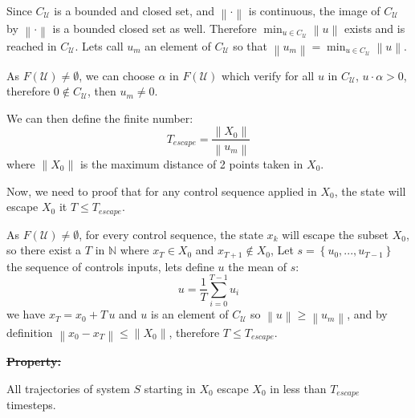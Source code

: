 \documentclass[12pt]{article}
\providecommand{\DIFdel}[1]{{\protect\color{red}\sout{#1}}}                      %
\providecommand{\DIFaddbegin}{} %
\providecommand{\DIFaddend}{} %
\providecommand{\DIFdelbegin}{} %
\providecommand{\DIFdelend}{} %
\begin{document}
Since $C_\mathcal{U}$ is a bounded and closed set, and $\left \| \cdot \right \|$ is continuous, the image of $C_\mathcal{U}$ by $\left \| \cdot \right \|$ is a bounded closed set as well.
Therefore  $\min_{  u \in C_\mathcal{U}} \left \| u \right \|$ exists and is reached in $C_\mathcal{U}$. Lets call $u_m$ an element of $C_\mathcal{U}$ so that $\left \| u_m \right \| = \min_{  u \in C_\mathcal{U}} \left \| u \right \|$.

As $F(\mathcal{U}) \neq \emptyset$, we can choose $\alpha$ in $F(\mathcal{U})$ which verify for all $u$ in $C_\mathcal{U}$, $u \cdot \alpha >0$, therefore $0 \notin C_\mathcal{U}$, then $u_m \neq 0$.

We can then define the finite number:
\begin{equation}
T_{escape} = \frac{\left \| X_0 \right \|}{\left \| u_m \right \|}
\end{equation}
where $\left \| X_0 \right \|$ is the maximum distance of 2 points taken in $X_0$.

Now, we need to proof that for any control sequence applied in $X_0$, the state will escape $X_0$ it $T \leq T_{escape}$.

As $F(\mathcal{U}) \neq \emptyset$, for every control sequence, the state $x_k$ will escape the subset $X_0$, so there exist a $T$ in $\mathbb{N}$ where $x_{T} \in X_0$ and $x_{T+1} \notin X_0$, Let $s = \left \{u_0,...,u_{T-1} \right \}$ the sequence of controls inputs, lets define $u$ the mean of $s$:
\begin{equation}
u = \frac{1}{T} \sum_{i=0}^{T-1} u_i
\end{equation}
we have $x_T = x_0 + T \, u$ and $u$ is an element of $C_\mathcal{U}$ so $\left \| u \right \| \geq \left \| u_m \right \|$, and by definition $\left \| x_0 - x_T \right \| \leq \left \| X_0 \right \|$, therefore $T \leq T_ {escape}$.


\DIFdelbegin \textbf{\DIFdel{Property:}}
\DIFdelend \DIFaddbegin \begin{property}
\DIFaddend All trajectories of system $S$ starting in $X_0$ escape $X_0$ in less than $T_{escape}$ timesteps.
\DIFaddbegin \end{property}
\DIFaddend 
\end{document}
